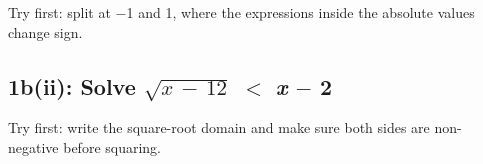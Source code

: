\documentclass[11pt]{article}
\begin{document}
\begin{keepsection}
\begin{keepsection}
Try first: split at \ensuremath{-}1 and 1, where the expressions inside the absolute values change sign.

\end{keepsection}

\begin{keepsection}
\subsection{1b(ii): Solve \ensuremath{\sqrt{{x}\, -\, 12}} \ensuremath{<} \textit{x} \ensuremath{-} 2}

Try first: write the square-root domain and make sure both sides are non-negative before squaring.

\end{keepsection}
\end{keepsection}
\end{document}
